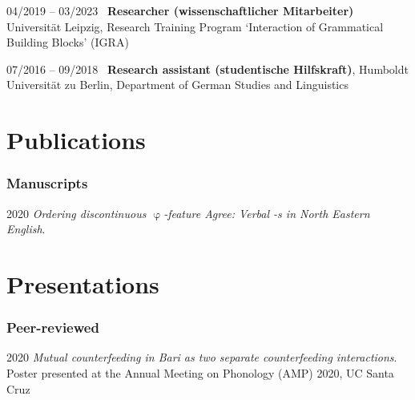\documentclass[11pt]{article}
\begin{document}
\begin{list}{}{
	\setlength{\leftmargin}{3.5cm}
	\setlength{\itemindent}{-2.5cm}
	}

	\item[04/2019 -- 03/2023~] \textbf{Researcher (wissenschaftlicher Mitarbeiter)} Universität Leipzig, Research Training Program `Interaction of Grammatical Building Blocks' (IGRA)
	
	\item[07/2016 -- 09/2018~] \textbf{Research assistant (studentische Hilfskraft)}, Humboldt Universität zu Berlin, Department of German Studies and Linguistics

\end{list}




\section*{Publications}
%	
\vspace{-1em}
\subsubsection*{Manuscripts}
\begin{list}{}{
		\setlength{\leftmargin}{3.5cm}
		\setlength{\itemindent}{-2.5cm}
	}
	
	\item[2020\phantom{~--~03/2022/04~}] \textit{Ordering discontinuous $\upvarphi$-feature Agree: Verbal -s in North Eastern English}.
\end{list}


\section*{Presentations}
\vspace{-1em}
\subsubsection*{Peer-reviewed}
\begin{list}{}{
		\setlength{\leftmargin}{3.5cm}
		\setlength{\itemindent}{-2.5cm}
	}
	
	\item[2020\phantom{~--~03/2022/04~}] \textit{Mutual counterfeeding in Bari as two separate counterfeeding interactions}. Poster presented at the Annual Meeting on Phonology (AMP) 2020, UC Santa Cruz
\end{list}
\end{document}
